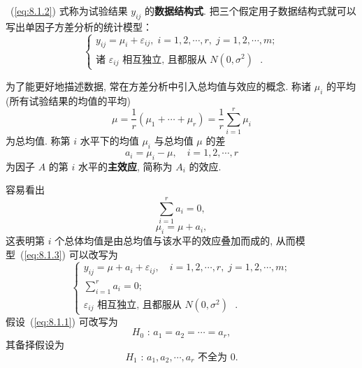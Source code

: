 ~(\ref{eq:8.1.2}) 式称为试验结果 $y_{ij}$ 的\textbf{数据结构式}. 把三个假定用子数据结构式就可以写出单因子方差分析的统计模型：
\begin{equation}
  \label{eq:8.1.3}
  \begin{cases}
    y_{ij}  = \mu_i + \varepsilon_{ij}, \; i = 1,2,\cdots,r,\; j = 1,2,\cdots,m; \\
    \text{诸 $\varepsilon_{ij}$ 相互独立, 且都服从 $N(0,\sigma^2)$ }.
  \end{cases}
\end{equation}

为了能更好地描述数据, 常在方差分析中引入总均值与效应的概念. 称诸 $\mu_i$ 的平均(所有试验结果的均值的平均)
\begin{equation}
  \label{eq.8.1.4}
  \mu = \frac{1}{r} (\mu_1 + \cdots + \mu_r) = \frac{1}{r} \sum_{i=1}^{r} \mu_i
\end{equation}
为总均值. 称第 $i$ 水平下的均值 $\mu_i$ 与总均值 $\mu$ 的差
\begin{equation}
  \label{eq:8.1.5}
  a_i = \mu_i - \mu, \quad i = 1,2,\cdots,r
\end{equation}
为因子 $A$ 的第 $i$ 水平的\textbf{主效应}, 简称为 $A_i$ 的效应.

容易看出
\begin{equation}
  \label{eq:8.1.6}
  \sum_{i=1}^{r} a_i = 0,
\end{equation}
\begin{equation}
  \label{eq:8.1.7}
  \mu_i = \mu + a_i,
\end{equation}
这表明第 $i$ 个总体均值是由总均值与该水平的效应叠加而成的, 从而模型~(\ref{eq:8.1.3}) 可以改写为
\begin{equation}
  \label{eq:8.1.8}
  \begin{cases}
    y_{ij}  = \mu + a_i + \varepsilon_{ij}, \quad i = 1,2,\cdots,r,\; j = 1,2,\cdots,m; \\
    \sum_{i=1}^{r} a_i = 0; \\
    \text{$\varepsilon_{ij}$ 相互独立, 且都服从 $N(0,\sigma^2)$ }.
  \end{cases}
\end{equation}
假设~(\ref{eq:8.1.1}) 可改写为
\begin{equation}
  H_0 \textrm{ : } a_1 = a_2 = \cdots = a_r,\label{eq:8.1.9}
\end{equation}
其备择假设为
\begin{equation*}
  H_1 \text{ : } a_1,a_2,\cdots,a_r \text{ 不全为 0.}
\end{equation*}

